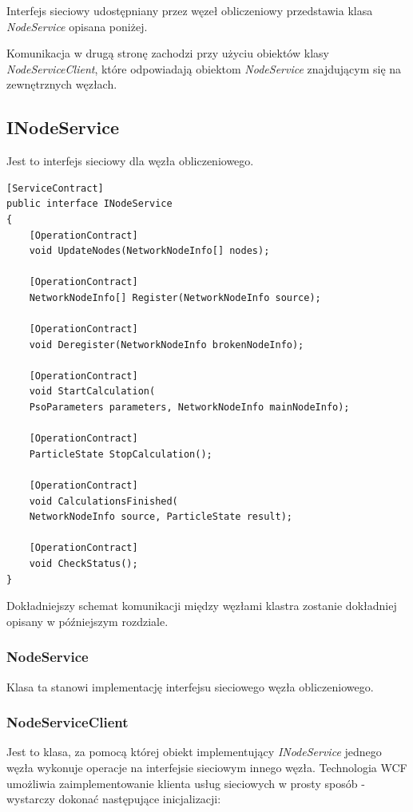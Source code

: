 \documentclass[12pt, twoside, openany, abstract=on]{report}
\theoremstyle{definition}
\begin{document}
Interfejs sieciowy udostępniany przez węzeł obliczeniowy przedstawia klasa \textit{NodeService} opisana poniżej.

Komunikacja w drugą stronę zachodzi przy użyciu obiektów klasy \textit{NodeServiceClient}, które odpowiadają obiektom \textit{NodeService} znajdującym się na zewnętrznych węzłach.

\subsection{INodeService}
Jest to interfejs sieciowy dla węzła obliczeniowego.

\lstset{style=sharpc}
\begin{lstlisting}[frame=single]
[ServiceContract]
public interface INodeService
{
    [OperationContract] 
    void UpdateNodes(NetworkNodeInfo[] nodes);

    [OperationContract]
    NetworkNodeInfo[] Register(NetworkNodeInfo source);

    [OperationContract]
    void Deregister(NetworkNodeInfo brokenNodeInfo);

    [OperationContract]
    void StartCalculation(
    PsoParameters parameters, NetworkNodeInfo mainNodeInfo);

    [OperationContract]
    ParticleState StopCalculation();

    [OperationContract]
    void CalculationsFinished(
    NetworkNodeInfo source, ParticleState result);

    [OperationContract]
    void CheckStatus();
}
\end{lstlisting}

Dokładniejszy schemat komunikacji między węzłami klastra zostanie dokładniej opisany w późniejszym rozdziale.

\subsubsection{NodeService}
Klasa ta stanowi implementację interfejsu sieciowego węzła obliczeniowego.

\subsubsection{NodeServiceClient}
Jest to klasa, za pomocą której obiekt implementujący \textit{INodeService} jednego węzła wykonuje operacje na interfejsie sieciowym innego węzła. Technologia WCF umożliwia zaimplementowanie klienta usług sieciowych w prosty sposób - wystarczy dokonać następujące inicjalizacji:
\end{document}
